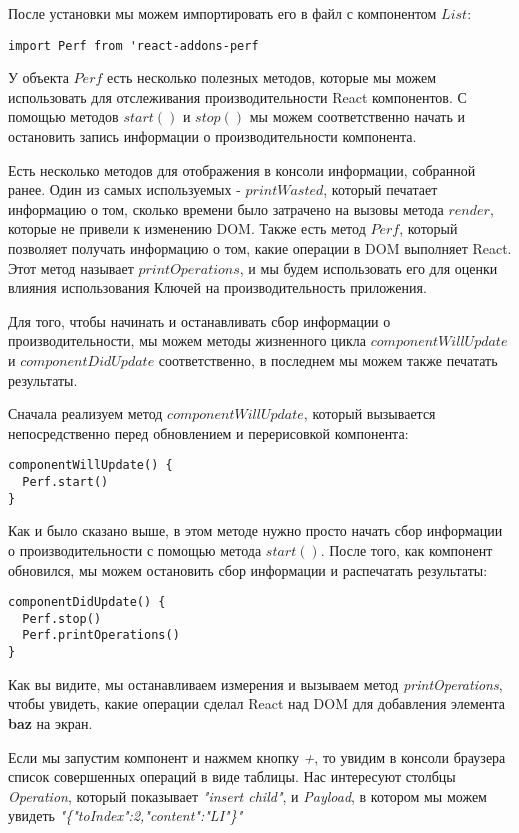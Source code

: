 После установки мы можем импортировать его в файл с компонентом $List$:

\begin{lstlisting}
import Perf from 'react-addons-perf
\end{lstlisting}

У объекта $Perf$ есть несколько полезных методов, которые мы можем использовать для отслеживания производительности React компонентов. С помощью методов $start()$ и $stop()$ мы можем соответственно начать и остановить запись информации о производительности компонента. 

Есть несколько методов для отображения в консоли информации, собранной ранее. Один из самых используемых - $printWasted$, который печатает информацию о том, сколько времени было затрачено на вызовы метода $render$, которые не привели к изменению DOM. Также есть метод $Perf$, который позволяет получать информацию о том, какие операции в DOM выполняет React. Этот метод называет $printOperations$, и мы будем использовать его для оценки влияния использования Ключей на производительность приложения. 

Для того, чтобы начинать и останавливать сбор информации о производительности, мы можем методы жизненного цикла $componentWillUpdate$ и $componentDidUpdate$ соответственно, в последнем мы можем также печатать результаты.

Сначала реализуем метод $componentWillUpdate$, который вызывается непосредственно перед обновлением и перерисовкой компонента:

\begin{lstlisting}
componentWillUpdate() {
  Perf.start()
}
\end{lstlisting}

Как и было сказано выше, в этом методе нужно просто начать сбор информации о производительности с помощью метода $start()$. После того, как компонент обновился, мы можем остановить сбор информации и распечатать результаты:

\begin{lstlisting}
componentDidUpdate() {
  Perf.stop()
  Perf.printOperations()
}
\end{lstlisting}

Как вы видите, мы останавливаем измерения и вызываем метод \textit{printOperations}, чтобы увидеть, какие операции сделал React над DOM для добавления элемента \textbf{baz} на экран.

Если мы запустим компонент и нажмем кнопку \textit{+}, то увидим в консоли браузера список совершенных операций в виде таблицы. Нас интересуют столбцы \textit{Operation}, который показывает \textit{"insert child"}, и \textit{Payload}, в котором мы можем увидеть \textit{"\{"toIndex":2,"content":"LI"\}"} 


